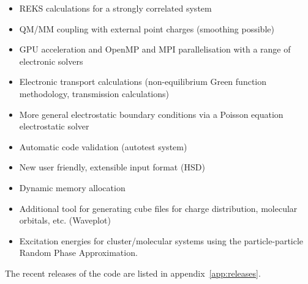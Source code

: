 \begin{itemize}
\item REKS calculations for a strongly correlated system
\item QM/MM coupling with external point charges (smoothing possible)
\item GPU acceleration and OpenMP and MPI parallelisation with a
  range of electronic solvers
\item Electronic transport calculations (non-equilibrium Green function
  methodology, transmission calculations)
\item More general electrostatic boundary conditions via a Poisson equation
  electrostatic solver
\item Automatic code validation (autotest system)
\item New user friendly, extensible input format (HSD)
\item Dynamic memory allocation
\item Additional tool for generating cube files for charge distribution,
  molecular orbitals, etc. (Waveplot)
\item Excitation energies for cluster/molecular systems using the particle-particle Random Phase Approximation.
\end{itemize}

The recent releases of the code are listed in appendix~\ref{app:releases}.
